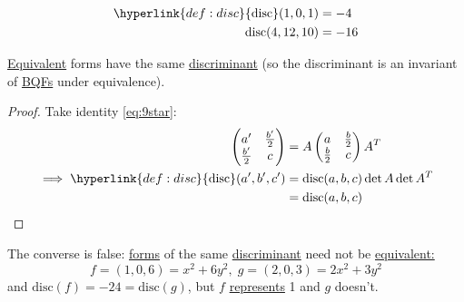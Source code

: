 \documentclass{article}
\DeclareMathOperator{\disc}{disc}
\begin{document}

\begin{eg}
    \begin{align*}
        \hyperlink{def:disc}{\disc}(1, 0, 1) &= -4 \\
        \disc(4, 12, 10) &= -16
    \end{align*}
\end{eg}

\begin{nlemma}\label{lem:4.2}
    \hyperlink{def:uniSub}{Equivalent} forms have the same \hyperlink{def:disc}{discriminant} (so the discriminant is an invariant of \hyperlink{def:bqf}{BQFs} under equivalence).
\end{nlemma}

\begin{proof}
    Take identity \eqref{eq:9star}:
    \begin{align*}
        \begin{pmatrix} a' & \frac{b'}{2} \\ \frac{b'}{2} & c \end{pmatrix}
        &= A \begin{pmatrix} a & \frac{b}{2} \\ \frac{b}{2} & c \end{pmatrix}
        A^T \\
        \implies \hyperlink{def:disc}{\disc}(a', b', c') &= \mathrm{disc}(a, b, c) \det A \det A^T \\
                                           &= \mathrm{disc}(a, b, c) \qedhere
    \end{align*}
\end{proof}

\begin{remark}
    The converse is false: \hyperlink{def:bqf}{forms} of the same \hyperlink{def:disc}{discriminant} need not be \hyperlink{def:uniSub}{equivalent:}
    \begin{equation*}
        f = (1, 0, 6) = x^2 + 6y^2, \; g = (2, 0, 3) = 2x^2 + 3y^2
    \end{equation*}
    and $\mathrm{disc}(f) = -24 = \mathrm{disc}(g)$, but $f$ \hyperlink{def:rep}{represents} 1 and $g$ doesn't.
\end{remark}
\end{document}

